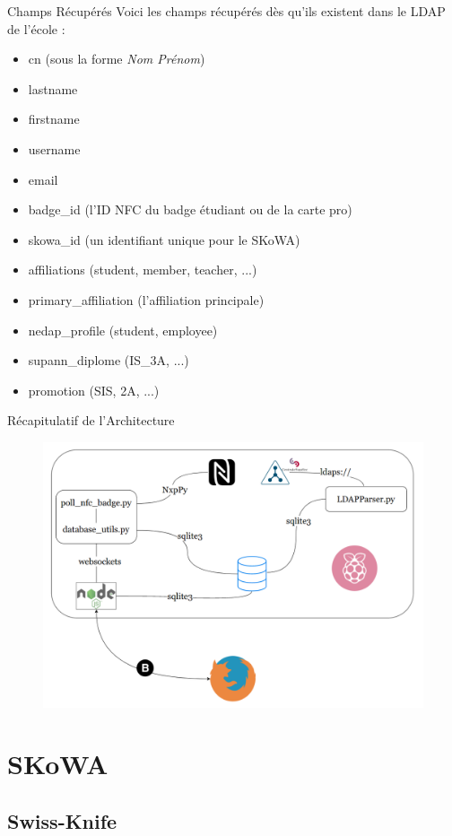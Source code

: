 \documentclass[aspectratio=169]{beamer}
\begin{document}
\begin{frame}{Champs Récupérés}
   Voici les champs récupérés dès qu'ils existent dans le LDAP de l'école :
   \begin{itemize}
       \item cn (sous la forme \textit{Nom Prénom})
       \item lastname
       \item firstname
       \item username
       \item email
       \item badge\_id (l'ID NFC du badge étudiant ou de la carte pro)
       \item skowa\_id (un identifiant unique pour le SKoWA)
       \item affiliations (student, member, teacher, ...)
       \item primary\_affiliation (l'affiliation principale)
       \item nedap\_profile (student, employee)
       \item supann\_diplome (IS\_3A, ...)
       \item promotion (SIS, 2A, ...)
   \end{itemize}
\end{frame}

\begin{frame}{Récapitulatif de l'Architecture}
    \begin{figure}
        \centering
        \includegraphics[width=.45\textwidth]{../assets/architectureraspberrypi.png}
    \end{figure}
\end{frame}

\section{SKoWA}

\subsection{Swiss-Knife}
\end{document}
